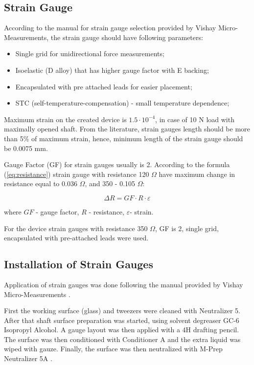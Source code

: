 	\subsection{Strain Gauge}
	\label{sec:SGReq}
	According to the manual for strain gauge selection provided by Vishay Micro-Measurements, the strain gauge should have following parameters:
\begin{itemize}
  \item Single grid for unidirectional force measurements;
  \item Isoelastic (D alloy) that has higher gauge factor with E backing;
  \item Encapsulated with pre attached leads for easier placement;
  \item STC (self-temperature-compensation) - small temperature dependence;
\end{itemize}	
	
Maximum strain on the created device is $1.5 \cdot 10^{-4}$, in case of 10 N load with maximally opened shaft. From the literature, strain gauges length should be more than 5\% of maximum strain, hence, minimum length of the strain gauge should be 0.0075 mm. 

Gauge Factor (GF) for strain gauges usually is 2. According to the formula (\ref{eq:resistance}) strain gauge with resistance 120 $\Omega$ have maximum change in resistance equal to 0.036 $\Omega$, and 350  - 0.105 $\Omega$:

\begin{equation}\label{eq:resistance}
\Delta R=GF \cdot R \cdot \varepsilon
\end{equation}

where $GF$ - gauge factor, $R$ - resistance, $\varepsilon$- strain.

For the device strain gauges with resistance 350 $\Omega$, GF is 2, single grid, encapsulated with pre-attached leads were used.

	\subsection{Installation of Strain Gauges}
	\label{sec:instSG}

	Application of strain gauges was done following the manual provided by Vishay Micro-Measurements \cite{StrGugeInst}.

	First the working surface (glass) and tweezers were cleaned with Neutralizer 5. 
	After that shaft surface preparation was started, using solvent degreaser GC-6 Isopropyl Alcohol. 
	A gauge layout was then applied with a 4H drafting pencil. The surface was then conditioned with Conditioner A and the extra liquid was wiped with gauze. 
	Finally, the surface was then neutralized with M-Prep Neutralizer 5A \cite{StrGugeInst}.

